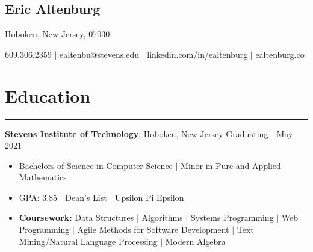 \documentclass[10pt]{article}
\newcommand{\name}[1]{\begin{center}\section*{\huge #1}\end{center}}
\newcommand{\topinfo}[1]{\begin{center}\vspace{-0.15cm}#1\vspace{-0.15cm}\end{center}}
\newcommand{\resumesection}[1]{\vspace{-0.2cm}\section*{#1}\vspace{-0.2cm}\hrule\vspace{0.2cm}}
\begin{document}
\name{Eric Altenburg}
\topinfo{Hoboken, New Jersey, 07030}

\topinfo{609.306.2359 $\vert$ ealtenbu@stevens.edu $\vert$ linkedin.com/in/ealtenburg $\vert$ ealtenburg.co}








\resumesection{Education}
\textbf{Stevens Institute of Technology}, Hoboken, New Jersey \hfill Graduating - May 2021
\begin{itemize}
	\item[] Bachelors of Science in Computer Science $\vert$ Minor in Pure and Applied Mathematics
	\item[] GPA: 3.85 $\vert$ Dean's List $\vert$ Upsilon Pi Epsilon 
	\item[] \textbf{Coursework:} Data Structures $\vert$ Algorithms $\vert$ Systems Programming $\vert$ Web Programming $\vert$ Agile Methods for Software Development $\vert$ Text Mining/Natural Language Processing $\vert$ Modern Algebra
\end{itemize}
\end{document}
